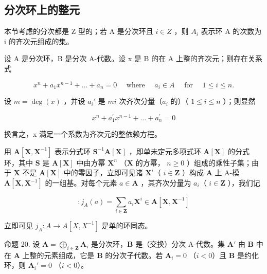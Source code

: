 \subsection{分次环上的整元}

本节考虑的分次都是 Z 型的；若 A 是分次环且 \(i \in Z\) ，则 \(A_{i}\) 表示环 A 的次数为 i 的齐次元组成的集。

设 A 是分次环，B 是分次 A-代数。设 x 是 B 的在 A 上整的齐次元；则存在关系式

\[
x ^ {n} + a _ {1} x ^ {n - 1} + \dots + a _ {n} = 0 \quad \text { where } \quad a _ {i} \in A \quad \text { for } \quad 1 \leqslant i \leqslant n.\tag{3}
\]

设 \(m = \deg(x)\) ，并设 \(a_i'\) 是 \(mi\) 次齐次分量（\(a_i\) 的）（ \(1 \leqslant i \leqslant n\) ）；则显然

\[
x ^ {n} + a _ {1} ^ {\prime} x ^ {n - 1} + \dots + a _ {n} ^ {\prime} = 0\tag{4}
\]

换言之，x 满足一个系数为齐次元的整依赖方程。

用 \(\mathbf{A}[\mathbf{X},\mathbf{X}^{-1}]\) 表示分式环 \(\mathbf{S}^{-1}\mathbf{A}[\mathbf{X}]\) ，即单未定元多项式环 \(\mathbf{A}[\mathbf{X}]\) 的分式环，其中 \(\mathbf{S}\) 是 \(\mathbf{A}[\mathbf{X}]\) 中由方幂 \(\mathbf{X}^n\) （\(\mathbf{X}\) 的方幂， \(n\geqslant 0\) ）组成的乘性子集；由于 \(\mathbf{X}\) 不是 \(\mathbf{A}[\mathbf{X}]\) 中的零因子，立即可见诸 \(\mathbf{X}^i\)（ \(i\in \mathbf{Z}\) ）构成 \(\mathbf{A}\) 上 A-模 \(\mathbf{A}[\mathbf{X},\mathbf{X}^{-1}]\) 的一组基。对每个元素 \(a\in \mathbf{A}\) ，其齐次分量为 \(a_{i}\)（ \(i\in \mathbf{Z}\) ），我们记

\[
:j_{A}(a) = \sum_{i \in \mathbf{Z}} a_{i} \mathbf{X}^{i} \in \mathbf{A}[\mathbf{X},\mathbf{X}^{-1}]\tag{5}
\]

立即可见 \(j_{A}: A \to A[X, X^{-1}]\) 是单的环同态。

命题 20. 设 \(\mathbf{A} = \bigoplus_{i\in \mathbf{Z}}\mathbf{A}_i\) 是分次环，\(\mathbf{B}\) 是（交换）分次 A-代数。集 \(\mathbf{A}'\) 由 \(\mathbf{B}\) 中在 \(\mathbf{A}\) 上整的元素组成，它是 \(\mathbf{B}\) 的分次子代数。若 \(\mathbf{A}_i = 0\) （\(i < 0\)）且 \(\mathbf{B}\) 是约化环，则 \(\mathbf{A}_i' = 0\) （\(i < 0\)）。

